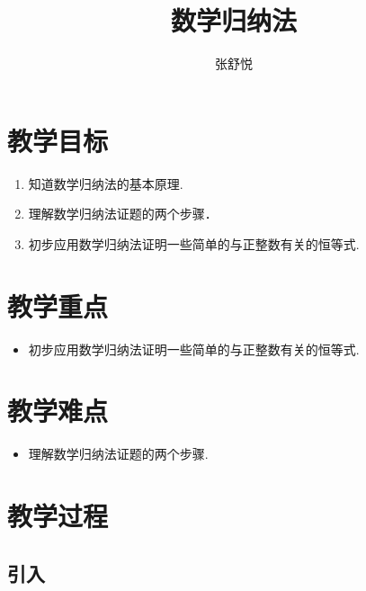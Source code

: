 \documentclass{article}
\begin{document}
\begin{CJK}{UTF8}{gkai}

\title{数学归纳法}
\date{}
\author{张舒悦}
\maketitle

\section{教学目标}
\begin{enumerate}
\item 知道数学归纳法的基本原理.
\item 理解数学归纳法证题的两个步骤．
\item 初步应用数学归纳法证明一些简单的与正整数有关的恒等式.
\end{enumerate}

\section{教学重点}
\begin{itemize}
\item 初步应用数学归纳法证明一些简单的与正整数有关的恒等式.
\end{itemize}

\section{教学难点}
\begin{itemize}
\item  理解数学归纳法证题的两个步骤.
\end{itemize}

\section{教学过程}
\subsection{引入}

\end{CJK}
\end{document}

